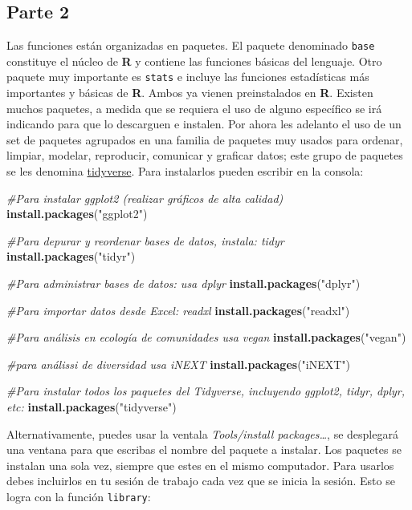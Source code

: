 \documentclass[
]{article}
\newenvironment{Shaded}{\begin{snugshade}}{\end{snugshade}}
\newcommand{\CommentTok}[1]{\textcolor[rgb]{0.56,0.35,0.01}{\textit{#1}}}
\newcommand{\KeywordTok}[1]{\textcolor[rgb]{0.13,0.29,0.53}{\textbf{#1}}}
\newcommand{\NormalTok}[1]{#1}
\newcommand{\StringTok}[1]{\textcolor[rgb]{0.31,0.60,0.02}{#1}}
\begin{document}
\hypertarget{parte-2}{%
\subsection{Parte 2}\label{parte-2}}

Las funciones están organizadas en paquetes. El paquete denominado
\texttt{base} constituye el núcleo de \textbf{R} y contiene las
funciones básicas del lenguaje. Otro paquete muy importante es
\texttt{stats} e incluye las funciones estadísticas más importantes y
básicas de \textbf{R}. Ambos ya vienen preinstalados en \textbf{R}.
Existen muchos paquetes, a medida que se requiera el uso de alguno
específico se irá indicando para que lo descarguen e instalen. Por ahora
les adelanto el uso de un set de paquetes agrupados en una familia de
paquetes muy usados para ordenar, limpiar, modelar, reproducir,
comunicar y graficar datos; este grupo de paquetes se les denomina
\href{https://www.tidyverse.org/}{tidyverse}. Para instalarlos pueden
escribir en la consola:

\begin{Shaded}
\begin{Highlighting}[]
\CommentTok{#Para instalar ggplot2 (realizar gráficos de alta calidad)}
\KeywordTok{install.packages}\NormalTok{(}\StringTok{"ggplot2"}\NormalTok{)}

\CommentTok{#Para depurar y reordenar bases de datos, instala: tidyr}
\KeywordTok{install.packages}\NormalTok{(}\StringTok{"tidyr"}\NormalTok{)}

\CommentTok{#Para administrar bases de datos: usa dplyr}
\KeywordTok{install.packages}\NormalTok{(}\StringTok{"dplyr"}\NormalTok{)}

\CommentTok{#Para importar datos desde Excel: readxl}
\KeywordTok{install.packages}\NormalTok{(}\StringTok{"readxl"}\NormalTok{)}

\CommentTok{#Para análisis en ecología de comunidades usa vegan}
\KeywordTok{install.packages}\NormalTok{(}\StringTok{"vegan"}\NormalTok{)}

\CommentTok{#para análissi de diversidad usa iNEXT}
\KeywordTok{install.packages}\NormalTok{(}\StringTok{"iNEXT"}\NormalTok{)}

\CommentTok{#Para instalar todos los paquetes del Tidyverse, incluyendo ggplot2, tidyr, dplyr, etc:}
\KeywordTok{install.packages}\NormalTok{(}\StringTok{"tidyverse"}\NormalTok{)}
\end{Highlighting}
\end{Shaded}

Alternativamente, puedes usar la ventala \emph{Tools/install
packages\ldots{}}, se desplegará una ventana para que escribas el nombre
del paquete a instalar. Los paquetes se instalan una sola vez, siempre
que estes en el mismo computador. Para usarlos debes incluirlos en tu
sesión de trabajo cada vez que se inicia la sesión. Esto se logra con la
función \texttt{library}:
\end{document}
